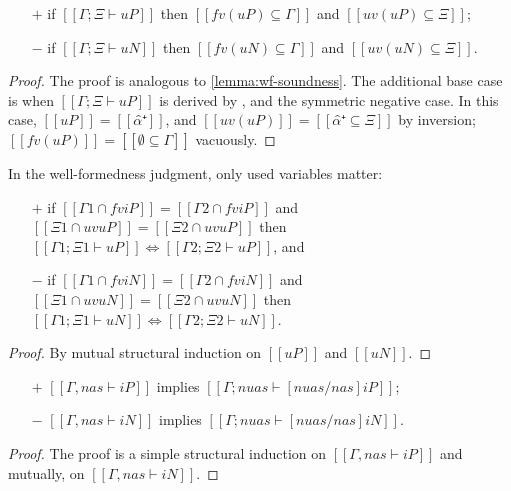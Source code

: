 \begin{lemma}
    \label{lemma:wf-algo-soundness}
    \hfill
  \begin{itemize}
    \item[$+$] if $[[Γ ; Ξ ⊢ uP]]$ then $[[fv(uP) ⊆ {Γ}]]$ and $[[uv(uP) ⊆ Ξ]]$;
    \item[$-$] if $[[Γ ; Ξ ⊢ uN]]$ then $[[fv(uN) ⊆ {Γ}]]$ and $[[uv(uN) ⊆ Ξ]]$.
  \end{itemize}
\end{lemma}
\begin{proof}
  The proof is analogous to \cref{lemma:wf-soundness}.
  The additional base case is when $[[Γ ; Ξ ⊢ uP]]$ is derived by ,
  and the symmetric negative case.
  In this case, $[[uP]] = [[α̂⁺]]$, and $[[uv(uP)]] = [[{α̂⁺} ⊆ Ξ]]$ by inversion; $[[fv(uP)]] = [[∅ ⊆ {Γ}]]$ vacuously.
\end{proof}

\begin{lemma}
  \label{lemma:wf-algo-ctxt-equiv}
  In the well-formedness judgment, only used variables matter:
  \begin{itemize}
  \item[$+$] if $[[{Γ1} ∩ fv iP]] = [[{Γ2} ∩ fv iP]]$
    and $[[Ξ1 ∩ uv uP]] = [[Ξ2 ∩ uv uP]]$ then
    $[[Γ1 ; Ξ1 ⊢ uP]] \iff [[Γ2 ; Ξ2 ⊢ uP]]$, and
  \item[$-$] if $[[{Γ1} ∩ fv iN]] = [[{Γ2} ∩ fv iN]]$
    and $[[Ξ1 ∩ uv uN]] = [[Ξ2 ∩ uv uN]]$ then
    $[[Γ1 ; Ξ1 ⊢ uN]] \iff [[Γ2 ; Ξ2 ⊢ uN]]$.
  \end{itemize}
\end{lemma}
\begin{proof}
  By mutual structural induction on $[[uP]]$ and $[[uN]]$.
\end{proof}

\begin{lemma}
  \hfill
  \begin{itemize}
    \item[$+$]  $[[Γ, nas ⊢ iP]]$ implies $[[Γ; nuas ⊢ [nuas/nas]iP]]$;
    \item[$-$]  $[[Γ, nas ⊢ iN]]$ implies $[[Γ; nuas ⊢ [nuas/nas]iN]]$.
  \end{itemize}
\end{lemma}
\begin{proof}
  The proof is a simple structural induction on $[[Γ, nas ⊢ iP]]$ and mutually, on $[[Γ, nas ⊢ iN]]$.
\end{proof}


